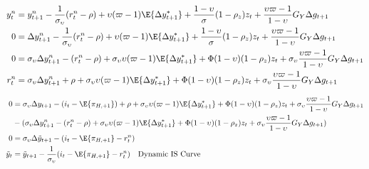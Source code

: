 \begin{align}
    y^n_t  &= y^n_{t+1} - \frac{1}{\sigma_\upsilon}(r^n_t - \rho) + \upsilon (\varpi - 1)\E \{\Delta y_{t+1}^* \}  + \frac{1-\upsilon}{\sigma} (1-\rho_z)z_t + \frac{\upsilon \varpi  - 1}{1-\upsilon} G_Y \Delta g_{t+1}\\
    0  &= \Delta y^n_{t+1} - \frac{1}{\sigma_\upsilon}(r^n_t - \rho) + \upsilon (\varpi - 1)\E \{\Delta y_{t+1}^* \}  + \frac{1-\upsilon}{\sigma} (1-\rho_z)z_t + \frac{\upsilon \varpi  - 1}{1-\upsilon} G_Y \Delta g_{t+1}\\
    0  &= \sigma_\upsilon \Delta y^n_{t+1} - (r^n_t - \rho) + \sigma_\upsilon \upsilon (\varpi - 1)\E \{\Delta y_{t+1}^* \}  + \Phi (1-\upsilon)(1-\rho_z)z_t + \sigma_\upsilon \frac{\upsilon \varpi  - 1}{1-\upsilon} G_Y \Delta g_{t+1}\\
    r^n_t  &= \sigma_\upsilon \Delta y^n_{t+1} + \rho + \sigma_\upsilon \upsilon (\varpi - 1)\E \{\Delta y_{t+1}^* \}  + \Phi (1-\upsilon)(1-\rho_z)z_t + \sigma_\upsilon \frac{\upsilon \varpi  - 1}{1-\upsilon} G_Y \Delta g_{t+1}\\
\end{align}
\begin{align}
    0 &= \sigma_\upsilon \Delta y_{t+1} - (i_t - \E \{ \pi_{H,+1}\}) + \rho + \sigma_\upsilon \upsilon (\varpi - 1)\E \{\Delta y_{t+1}^* \}  + \Phi(1-\upsilon) (1-\rho_z)z_t + \sigma_\upsilon \frac{\upsilon \varpi  - 1}{1-\upsilon} G_Y \Delta g_{t+1} \\
    & - (\sigma_\upsilon \Delta y^n_{t+1} - (r^n_t - \rho) + \sigma_\upsilon \upsilon (\varpi - 1)\E \{\Delta y_{t+1}^* \}  + \Phi (1-\upsilon)(1-\rho_z)z_t + \sigma_\upsilon \frac{\upsilon \varpi  - 1}{1-\upsilon} G_Y \Delta g_{t+1})\\
    0 &= \sigma_\upsilon \Delta \tilde{y}_{t+1} - (i_t - \E \{ \pi_{H,+1}\} - r^n_t)\\
    \tilde{y}_t &= \tilde{y}_{t+1} - \frac{1}{\sigma_\upsilon}(i_t - \E \{ \pi_{H,+1}\} - r^n_t) \quad \text{Dynamic IS Curve}\\
\end{align}
\pagebreak
